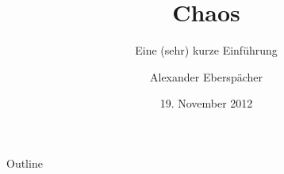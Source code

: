 \documentclass[compress]{beamer}
\title{Chaos}
\subtitle{Eine (sehr) kurze Einführung} %
\author{Alexander Eberspächer}
\date{19. November 2012} %
\begin{document}
\begin{frame} %
  \titlepage
  \thispagestyle{empty}
\end{frame}

\begin{frame}{Outline} %
  \tableofcontents
\end{frame}




\end{document}
